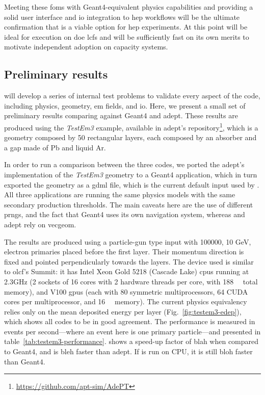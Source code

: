 Meeting these \acp{fom} with Geant4-equivalent physics capabilities and
providing a solid user interface and \ac{io} integration to \ac{hep} workflows
will be the ultimate confirmation that \celeritas is a viable option for
\ac{hep} experiments. At this point \celeritas will be ideal for execution on
\ac{doe} \acp{lcf} and will be sufficiently fast on its own merits to motivate
independent adoption on capacity systems.

\subsection{Preliminary results}

\celeritas will develop a series of internal test problems to validate every
aspect of the code, including physics, geometry, \ac{em} fields, and \ac{io}.
Here, we present a small set of preliminary results comparing \celeritas against
Geant4 and \acs{adept}. These results are produced using the \emph{TestEm3}
example, available in \acs{adept}'s repository\footnote
{
    \url{https://github.com/apt-sim/AdePT}
},
which is a geometry composed by 50 rectangular layers, each composed by an
absorber and a gap made of Pb and liquid Ar.

In order to run a comparison between the three codes, we ported the
\acs{adept}'s implementation of the \emph{TestEm3} geometry to a Geant4
application, which in turn exported the geometry as a \acs{gdml} file, which is
the current default input used by \celeritas. All three applications are running
the same physics models with the same secondary production thresholds. The main
caveats here are the use of different \acp{prng}, and the fact that Geant4 uses
its own navigation system, whereas \celeritas and \acs{adept} rely on
\acs{vecgeom}.

The results are produced using a particle-gun type input with \num{100000}, 10
GeV, electron primaries placed before the first layer. Their momentum direction
is fixed and pointed perpendicularly towards the layers. The device used is
similar to \ac{olcf}'s Summit: it has Intel Xeon Gold 5218 (Cascade Lake)
\acp{cpu} running at 2.3GHz (2 sockets of 16 cores with 2 hardware threads per
core, with \SI{188}{\giga\byte} total memory), and \nvidia V100 \acp{gpu} (each
with 80 symmetric multiprocessors, 64 CUDA cores per multiprocessor, and
\SI{16}{\giga\byte} memory). The current physics equivalency relies only on the
mean deposited energy per layer (Fig.~\ref{fig:testem3-edep}), which shows all
codes to be in good agreement. The performance is measured in events per
second---where an event here is one primary particle---and presented in
table~\ref{tab:testem3-performance}. \celeritas shows a speed-up factor of blah
when compared to Geant4, and is bleh faster than \acs{adept}. If \celeritas is
run on CPU, it is still bloh faster than Geant4.

